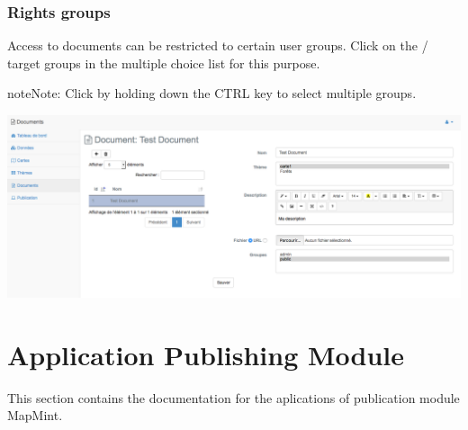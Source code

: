 \documentclass[letterpaper,10pt,english]{sphinxmanual}
\begin{document}
\subsection{Rights groups}
\label{documents/infopanel:droits-des-groupes}
Access to documents can be restricted to certain user groups. Click on the / target groups in the multiple choice list for this purpose.

\begin{notice}{note}{Note:}
Click by holding down the CTRL key to select multiple groups.
\end{notice}

\includegraphics[width=1.000\linewidth]{document-module-preview.png}


\chapter{Application Publishing Module}
\label{apps/index:apps}\label{apps/index::doc}\label{apps/index:module-de-publication-d-applications}
This section contains the documentation for the aplications of publication module MapMint.
\end{document}
